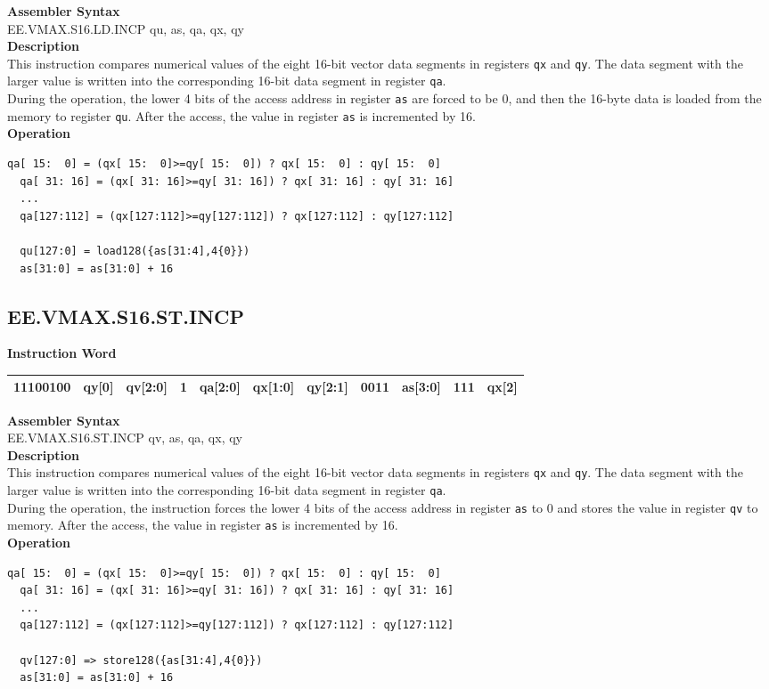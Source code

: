 \textbf{Assembler Syntax} \\
EE.VMAX.S16.LD.INCP qu, as, qa, qx, qy \\
\textbf{Description} \\
This instruction compares numerical values of the eight 16-bit vector data segments in registers \lstinline{qx} and \lstinline{qy}. The data segment with the larger value is written into the corresponding 16-bit data segment in register \lstinline{qa}.\\
During the operation, the lower 4 bits of the access address in register \lstinline{as} are forced to be 0, and then the 16-byte data is loaded from the memory to register \lstinline{qu}. After the access, the value in register \lstinline{as} is incremented by 16.\\
\textbf{Operation}
\begin{lstlisting}[escapeinside=`?]
  qa[ 15:  0] = (qx[ 15:  0]>=qy[ 15:  0]) ? qx[ 15:  0] : qy[ 15:  0]
  qa[ 31: 16] = (qx[ 31: 16]>=qy[ 31: 16]) ? qx[ 31: 16] : qy[ 31: 16]
  ...
  qa[127:112] = (qx[127:112]>=qy[127:112]) ? qx[127:112] : qy[127:112]

  qu[127:0] = load128({as[31:4],4{0}})
  as[31:0] = as[31:0] + 16
\end{lstlisting}

\clearpage
\subsection{EE.VMAX.S16.ST.INCP}\label{instruction:EEVMAXS16STINCP}
\setlength\tabcolsep{6pt}
\textbf{Instruction Word} \\
\begin{tabular}{|c|c|c|c|c|c|c|c|c|c|c|}
	\hline
	11100100 & qy[0] & qv[2:0] & 1 & qa[2:0] & qx[1:0] & qy[2:1] & 0011 & as[3:0] & 111 & qx[2] \\
	\hline
\end{tabular}

\textbf{Assembler Syntax} \\
EE.VMAX.S16.ST.INCP qv, as, qa, qx, qy \\
\textbf{Description} \\
This instruction compares numerical values of the eight 16-bit vector data segments in registers \lstinline{qx} and \lstinline{qy}. The data segment with the larger value is written into the corresponding 16-bit data segment in register \lstinline{qa}.\\
During the operation, the instruction forces the lower 4 bits of the access address in register \lstinline{as} to 0 and stores the value in register \lstinline{qv} to memory. After the access, the value in register \lstinline{as} is incremented by 16.\\
\textbf{Operation}
\begin{lstlisting}[escapeinside=`?]
  qa[ 15:  0] = (qx[ 15:  0]>=qy[ 15:  0]) ? qx[ 15:  0] : qy[ 15:  0]
  qa[ 31: 16] = (qx[ 31: 16]>=qy[ 31: 16]) ? qx[ 31: 16] : qy[ 31: 16]
  ...
  qa[127:112] = (qx[127:112]>=qy[127:112]) ? qx[127:112] : qy[127:112]

  qv[127:0] => store128({as[31:4],4{0}})
  as[31:0] = as[31:0] + 16
\end{lstlisting}

